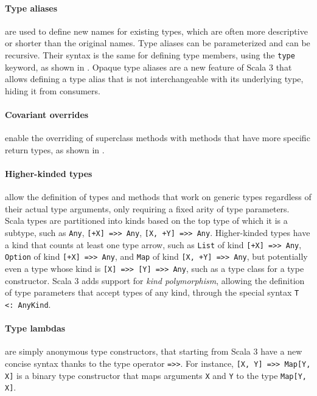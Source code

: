 \paragraph{Type aliases} are used to define new names for existing types, which are often more descriptive or shorter than the original names.
%
Type aliases can be parameterized and can be recursive.
%
Their syntax is the same for defining type members, using the \texttt{type} keyword, as shown in .
%
Opaque type aliases are a new feature of Scala 3 that allows defining a type alias that is not interchangeable with its underlying type, hiding it from consumers.



\paragraph{Covariant overrides} enable the overriding of superclass methods with methods that have more specific return types, as shown in .

\paragraph{Higher-kinded types} allow the definition of types and methods that work on generic types regardless of their actual type arguments, only requiring a fixed arity of type parameters.
%
Scala types are partitioned into kinds based on the top type of which it is a subtype, such as \texttt{Any}, \texttt{[+X] =>> Any}, \texttt{[X, +Y] =>> Any}.
%
Higher-kinded types have a kind that counts at least one type arrow, such as \texttt{List} of kind \texttt{[+X] =>> Any}, \texttt{Option} of kind \texttt{[+X] =>> Any}, and \texttt{Map} of kind \texttt{[X, +Y] =>> Any}, but potentially even a type whose kind is \texttt{[X] =>> [Y] =>> Any}, such as a type class for a type constructor.
%
Scala 3 adds support for \textit{kind polymorphism}, allowing the definition of type parameters that accept types of any kind, through the special syntax \texttt{T <: AnyKind}.

\paragraph{Type lambdas} are simply anonymous type constructors, that starting from Scala 3 have a new concise syntax thanks to the type operator \texttt{=>>}.
%
For instance, \texttt{[X, Y] =>> Map[Y, X]} is a binary type constructor that maps arguments \texttt{X} and \texttt{Y} to the type \texttt{Map[Y, X]}.

